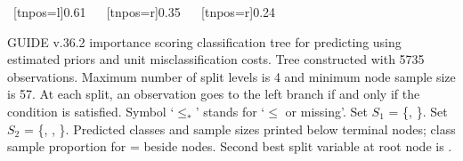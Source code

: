 \documentclass{article}
\begin{document}
\begin{center}
{{{{ }{
    ~[tnpos=l]{0.61}
    ~{}
    ~[tnpos=r]{0.35}
    ~{}
   }
   }
    ~[tnpos=r]{0.24}
    ~{}
 }
 }
 \end{center}
GUIDE v.36.2 importance scoring
classification tree for predicting \texttt{} using
estimated priors
and unit misclassification costs.
 Tree constructed with 5735 observations.
 Maximum number of split levels is 4 and minimum node sample size is 57.
At each split, an observation goes to the left branch 
 if and only if the condition is satisfied.
 Symbol `$\leq_*$' stands for `$\leq$ or missing'.
 Set $S_{1}$ = \{\texttt{}, \texttt{}\}.
 Set $S_{2}$ = \{\texttt{}, \texttt{},
 \texttt{}\}.
Predicted classes and sample sizes printed below terminal nodes;
class sample proportion for \texttt{} =
 \texttt{} beside nodes.
 Second best split variable at root node is \texttt{}.
 
\end{document}
